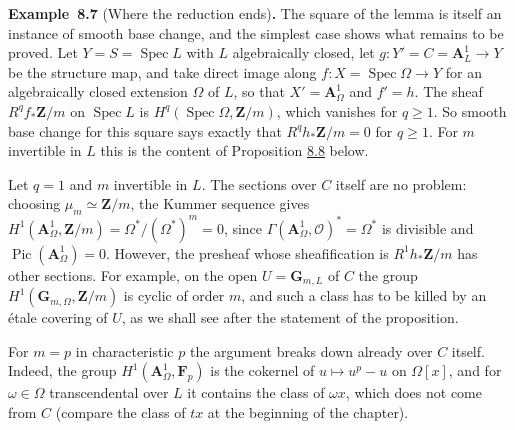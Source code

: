 \documentclass[11pt]{article}
\newenvironment{bpstatement}[2]{\par\addvspace{0.6\baselineskip}\noindent\textbf{#1}#2\textbf{.}\enspace\ignorespaces}
  {\par\addvspace{0.4\baselineskip}}
\begin{document}
\label{bp665}%
\begin{bpstatement}{Example~8.7}{ (Where the reduction ends)}
The square of the lemma is itself an instance of smooth base change, and the simplest case shows what remains to be proved. Let \(Y=S=\operatorname{Spec}L\) with \(L\) algebraically closed, let \(g:Y'=C=\mathbf A^1_L\to Y\) be the structure map, and take direct image along \(f:X=\operatorname{Spec}\Omega\to Y\) for an algebraically closed extension \(\Omega\) of \(L\), so that \(X'=\mathbf A^1_\Omega\) and \(f'=h\). The sheaf \(R^qf_*\mathbf Z/m\) on \(\operatorname{Spec}L\) is \(H^q(\operatorname{Spec}\Omega,\mathbf Z/m)\), which vanishes for \(q\geq1\). So smooth base change for this square says exactly that \(R^qh_*\mathbf Z/m=0\) for \(q\geq1\). For \(m\) invertible in \(L\) this is the content of Proposition \hyperref[bp668]{8.8} below.

Let \(q=1\) and \(m\) invertible in \(L\). The sections over \(C\) itself are no problem: choosing \(\mu_m\simeq\mathbf Z/m\), the Kummer sequence gives \(H^1(\mathbf A^1_\Omega,\mathbf Z/m)=\Omega^*/(\Omega^*)^m=0\), since \(\Gamma(\mathbf A^1_\Omega,\mathcal O)^*=\Omega^*\) is divisible and \(\operatorname{Pic}(\mathbf A^1_\Omega)=0\). However, the presheaf whose sheafification is \(R^1h_*\mathbf Z/m\) has other sections. For example, on the open \(U=\mathbf G_{m,L}\) of \(C\) the group \(H^1(\mathbf G_{m,\Omega},\mathbf Z/m)\) is cyclic of order \(m\), and such a class has to be killed by an étale covering of \(U\), as we shall see after the statement of the proposition.

For \(m=p\) in characteristic \(p\) the argument breaks down already over \(C\) itself. Indeed, the group \(H^1(\mathbf A^1_\Omega,\mathbf F_p)\) is the cokernel of \(u\mapsto u^p-u\) on \(\Omega[x]\), and for \(\omega\in\Omega\) transcendental over \(L\) it contains the class of \(\omega x\), which does not come from \(C\) (compare the class of \(tx\) at the beginning of the chapter).
\end{bpstatement}


\end{document}
